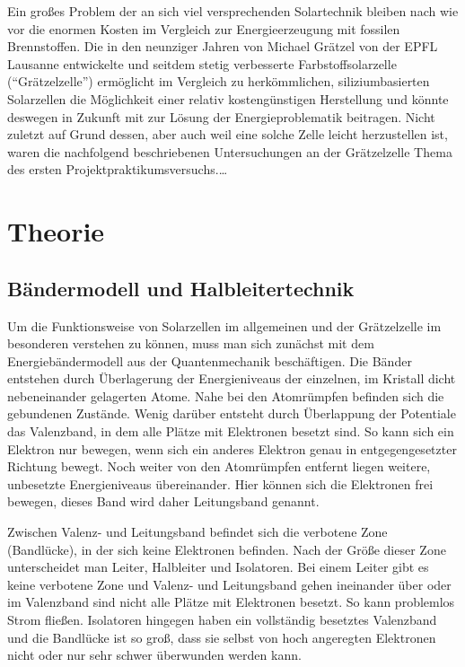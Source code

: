 \documentclass[11pt]{scrartcl}
\begin{document}
Ein großes Problem der an sich viel versprechenden Solartechnik bleiben nach wie vor die enormen Kosten im Vergleich zur Energieerzeugung mit fossilen Brennstoffen. Die in den neunziger Jahren von Michael Grätzel von der EPFL Lausanne entwickelte und seitdem stetig verbesserte Farbstoff\-solarzelle ("`Grätzelzelle"') ermöglicht im Vergleich zu herkömmlichen, siliziumbasierten Solarzellen die Möglichkeit einer relativ kostengünstigen Herstellung und könnte deswegen in Zukunft mit zur Lösung der Energieproblematik beitragen. Nicht zuletzt auf Grund dessen, aber auch weil eine solche Zelle leicht herzustellen ist, waren die nachfolgend beschriebenen Untersuchungen an der Grätzelzelle Thema des ersten Projektpraktikumsversuchs.\ldots





\section{Theorie}
\subsection{B\"andermodell und Halbleitertechnik}
Um die Funktionsweise von Solarzellen im allgemeinen und der Gr\"atzelzelle im besonderen verstehen zu k\"onnen, muss man sich zun\"achst mit dem Energieb\"andermodell aus der Quantenmechanik besch\"aftigen. Die B\"ander entstehen durch \"Uberlagerung der Energieniveaus der einzelnen, im Kristall dicht nebeneinander gelagerten Atome. Nahe bei den Atomr\"umpfen befinden sich die gebundenen Zust\"ande. Wenig dar\"uber entsteht durch \"Uberlappung der Potentiale das Valenzband, in dem alle Pl\"atze mit Elektronen besetzt sind. So kann sich ein Elektron nur bewegen, wenn sich ein anderes Elektron genau in entgegengesetzter Richtung bewegt. 
Noch weiter von den Atomr\"umpfen entfernt liegen weitere, unbesetzte Energieniveaus \"ubereinander. Hier k\"onnen sich die Elektronen frei bewegen, dieses Band wird daher Leitungsband genannt.

Zwischen Valenz- und Leitungsband befindet sich die verbotene Zone (Bandl\"ucke), in der sich keine Elektronen befinden. Nach der Gr\"o\ss{}e dieser Zone unterscheidet man Leiter, Halbleiter und Isolatoren. Bei einem Leiter gibt es keine verbotene Zone und Valenz- und Leitungsband gehen ineinander \"uber oder im Valenzband sind nicht alle Pl\"atze mit Elektronen besetzt. So kann problemlos Strom fließen. Isolatoren hingegen haben ein vollst\"andig besetztes Valenzband und die Bandl\"ucke ist so gro\ss{}, dass sie selbst von hoch angeregten Elektronen nicht oder nur sehr schwer \"uberwunden werden kann.
\end{document}
